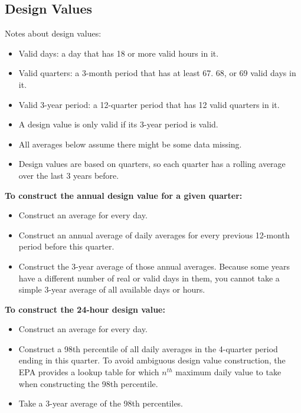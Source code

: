 \documentclass[12pt]{article}
\begin{document}
% 


\newpage
\subsection{Design Values}
\label{sec:design_values}

Notes about design values:
\begin{itemize}
    \item Valid days: a day that has 18 or more valid hours in it.
    \item Valid quarters: a 3-month period that has at least 67. 68, or 69 valid days in it.
    \item Valid 3-year period: a 12-quarter period that has 12 valid quarters in it.
    \item A design value is only valid if its 3-year period is valid.
    \item All averages below assume there might be some data missing.
    \item Design values are based on quarters, so each quarter has a rolling average over the last 3 years before.
\end{itemize}

\textbf{To construct the annual design value for a given quarter:}
\begin{itemize}
    \item Construct an average for every day.
    \item Construct an annual average of daily averages for every previous 12-month period before this quarter.
    \item Construct the 3-year average of those annual averages. Because some years have a different number of real or valid days in them, you cannot take a simple 3-year average of all available days or hours.
\end{itemize}

\textbf{To construct the 24-hour design value:}
\begin{itemize}
    \item Construct an average for every day.
    \item Construct a 98th percentile of all daily averages in the 4-quarter period ending in this quarter. To avoid ambiguous design value construction, the EPA provides a lookup table for which $n^{th}$ maximum daily value to take when constructing the 98th percentile.
    \item Take a 3-year average of the 98th percentiles.
\end{itemize}
\end{document}
